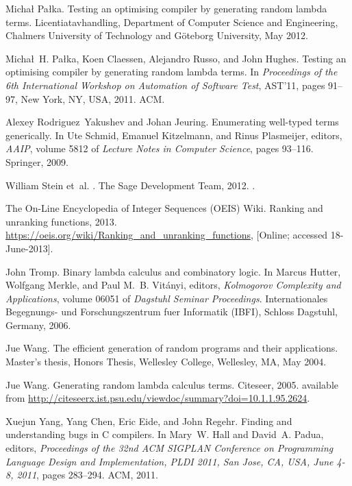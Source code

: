 \documentclass{jfp1}
\begin{document}
\begin{thebibliography}{10}
Micha{\l} Pa{\l}ka.
\newblock Testing an optimising compiler by generating random lambda terms.
\newblock Licentiatavhandling, Department of Computer Science and Engineering,
  Chalmers University of Technology and G\"oteborg University, May 2012.

Micha{\l}~H. Pa{\l}ka, Koen Claessen, Alejandro Russo, and John Hughes.
\newblock Testing an optimising compiler by generating random lambda terms.
\newblock In {\em Proceedings of the 6th International Workshop on Automation
  of Software Test}, AST'11, pages 91--97, New York, NY, USA, 2011. ACM.

Alexey {Rodriguez~Yakushev} and Johan Jeuring.
\newblock Enumerating well-typed terms generically.
\newblock In Ute Schmid, Emanuel Kitzelmann, and Rinus Plasmeijer, editors,
  {\em AAIP}, volume 5812 of {\em Lecture Notes in Computer Science}, pages
  93--116. Springer, 2009.

William Stein et~al.
.
\newblock The Sage Development Team, 2012.
.

{The On-Line Encyclopedia of Integer Sequences
  (OEIS) Wiki}.
\newblock Ranking and unranking functions, 2013.
\newblock \url{https://oeis.org/wiki/Ranking_and_unranking_functions}, [Online;
  accessed 18-June-2013].

John Tromp.
\newblock Binary lambda calculus and combinatory logic.
\newblock In Marcus Hutter, Wolfgang Merkle, and Paul M.~B. Vit{\'a}nyi,
  editors, {\em Kolmogorov Complexity and Applications}, volume 06051 of {\em
  Dagstuhl Seminar Proceedings}. Internationales Begegnungs- und
  Forschungszentrum fuer Informatik (IBFI), Schloss Dagstuhl, Germany, 2006.

Jue Wang.
\newblock The efficient generation of random programs and their applications.
\newblock Master's thesis, Honors Thesis, Wellesley College, Wellesley, MA, May
  2004.

Jue Wang.
\newblock Generating random lambda calculus terms.
\newblock Citeseer, 2005.
\newblock available from
  \url{http://citeseerx.ist.psu.edu/viewdoc/summary?doi=10.1.1.95.2624}.

Xuejun Yang, Yang Chen, Eric Eide, and John Regehr.
\newblock Finding and understanding bugs in {C} compilers.
\newblock In Mary~W. Hall and David~A. Padua, editors, {\em Proceedings of the
  32nd {ACM SIGPLAN} {Conference on Programming Language Design and
  Implementation}, {PLDI} 2011, {San Jose, CA, USA, June 4-8}, 2011}, pages
  283--294. ACM, 2011.

\end{thebibliography}
\end{document}
